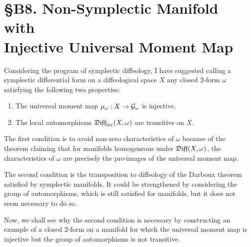 
\chapter*{\S B8. Non-Symplectic Manifold with \\ Injective Universal Moment Map}
\setcounter{footnote}{0}


\begin{abstract}
  This addendum is an exercise,
  with a detailed solution,
  based on Note 2 of article 9.23 of the textbook.
  This example shows how the condition of transitivity of the automorphisms is necessary for being a symplectic manifold.
\end{abstract}

Considering the program of symplectic diffeology,
I have suggested calling a symplectic differential form on a diffeological space $X$ any closed $2$-form $\omega$ satisfying the following two properties:

\begin{enumerate}
  \item The universal moment map $\mu_\omega : X \to  \mathcal{G}_\omega$ is injective.
  \item The local automorphisms $\mathfrak{Diff}_{\mathrm{loc}}(X,\omega)$ are transitive on $X$.
\end{enumerate}

The first condition is to avoid non-zero characteristics of $\omega$ because of the theorem \cite[\textsection\,9.26]{PIZ13} claiming that for manifolds homogeneous under $\mathfrak{Diff}(X,\omega)$,
the characteristics of $\omega$ are precisely the pre-images of the universal moment map.

The second condition is the transposition to diffeology of the Darboux theorem satisfied by symplectic manifolds.
It could be strengthened by considering the group of automorphisms,
which is still satisfied for manifolds,
but it does not seem necessary to do so.

Now,
we shall see why the second condition is necessary by constructing an example of a closed $2$-form on a manifold for which the universal moment map is injective but the group of automorphisms is not transitive.

